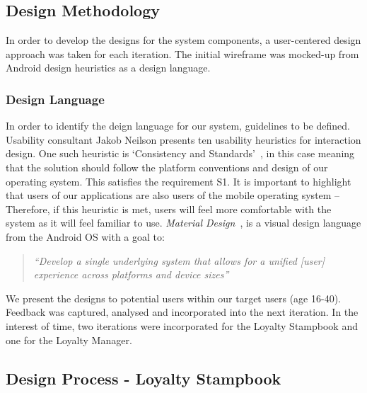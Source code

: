 \subsection{Design Methodology}
In order to develop the designs for the system components, a user-centered design\cite{usercentereddesign} approach was taken for each iteration. The initial wireframe was mocked-up from Android design heuristics as a design language.
\subsubsection{Design Language}
In order to identify the deign language for our system, guidelines to be defined. Usability consultant Jakob Neilson presents ten usability heuristics for interaction design. One such heuristic is `Consistency and Standards'~\cite{jakob}, in this case meaning that the solution should follow the platform conventions and design of our operating system. This satisfies the requirement S1. It is important to highlight that users of our applications are also users of the mobile operating system -- Therefore, if this heuristic is met, users will feel more comfortable with the system as it will feel familiar to use. \emph{Material Design}~\cite{materialDesign}, is a visual design language from the Android OS with a goal to:
\begin{quote}
    \textit{``Develop a single underlying system that allows for a unified [user] experience across platforms and device sizes''}~\cite[Introduction]{materialDesign}
\end{quote}

We present the designs to potential users within our target users (age 16-40). Feedback was captured, analysed and incorporated into the next iteration. In the interest of time, two iterations were incorporated for the Loyalty Stampbook and one for the Loyalty Manager.

\newpage{}
\subsection{Design Process - Loyalty Stampbook}
